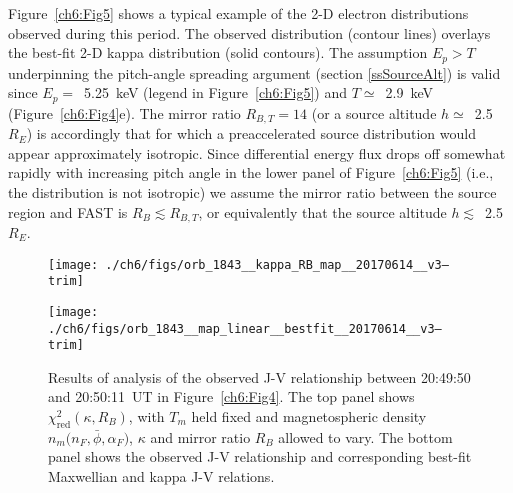  Figure~\ref{ch6:Fig5} shows a typical example of the 2-D electron
  distributions observed during this period. The observed distribution (contour
  lines) overlays the best-fit 2-D kappa distribution (solid contours). The
  assumption $E_p > T$ underpinning the pitch-angle spreading argument (section
  \ref{ssSourceAlt}) is valid since $E_p =$~5.25~keV (legend in
  Figure~\ref{ch6:Fig5}) and $T \simeq$~2.9~keV (Figure~\ref{ch6:Fig4}e). The
  mirror ratio $R_{B,T} = 14$ (or a source altitude $h \simeq$~2.5~$R_E$) is
  accordingly that for which a preaccelerated source distribution would appear
  approximately isotropic. Since differential energy flux drops off somewhat
  rapidly with increasing pitch angle in the lower panel of
  Figure~\ref{ch6:Fig5} (i.e., the distribution is not isotropic) we assume the
  mirror ratio between the source region and FAST is $R_B \lesssim R_{B,T}$, or
  equivalently that the source altitude $h \lesssim$~2.5~$R_E$.


  \begin{figure}
    \centering

    \noindent\texttt{[image: ./ch6/figs/orb\_1843\_\_kappa\_RB\_map\_\_20170614\_\_v3--trim]}

    \vspace{1cm}

    \noindent\texttt{[image: ./ch6/figs/orb\_1843\_\_map\_linear\_\_bestfit\_\_20170614\_\_v3--trim]}




    \caption[Orbit 1843: Reduced chi-squared values for observed J-V
    relationship and corresponding best-fit J-V curves.]{Results of analysis of
      the observed J-V relationship between 20:49:50 and 20:50:11~UT in
      Figure~\ref{ch6:Fig4}. The top panel shows
      $\chi^2_{\mathrm{red}} ( \kappa, R_B)$, with $T_m$ held fixed and
      magnetospheric density $n_m \big ( n_F, \bar{\phi}, \alpha_F \big )$,
      $\kappa$ and mirror ratio $R_B$ allowed to vary. The bottom panel shows
      the observed J-V relationship and corresponding best-fit Maxwellian and
      kappa J-V relations.}
    \label{ch6:Fig6}
  \end{figure}

